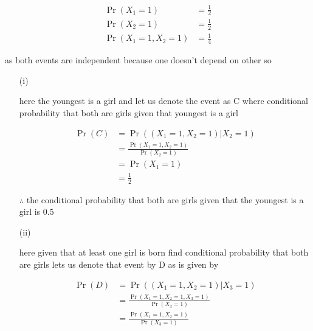 \documentclass[journal,12pt,twocolumn]{IEEEtran}
\providecommand{\pr}[1]{\ensuremath{\Pr\left(#1\right)}}
\begin{document}
    \begin{align}
        \pr{ X_{1} = 1 } &= \frac{1}{2} \\
        \pr{ X_{2} = 1 } &= \frac{1}{2} \\
        \pr{ X_{1} = 1 , X_{2} = 1 } &= \frac{1}{4}
    \end{align}
    
    as both events are independent because one doesn't depend on other so
   
   

    \begin{enumerate}
    
    
    
        \item[(i)]
        
         here the youngest is a girl and let us denote the event as C where conditional probability that both are girls given that youngest is a girl
         
         \begin{align}
             \pr{C} &= \pr{ (X_{1} = 1,X_{2} = 1) | X_{2} = 1 } \\
                    &= \frac{\pr{ {X_{1} = 1,X_{2} = 1}}}{\pr{X_{2} = 1}} \\
                    &= \pr{X_{1} = 1} \\
                    &= \frac{1}{2}
         \end{align}
         
         $\therefore$ the conditional probability that both are girls given that the youngest is a girl is $0.5$
         
         
         
        \item[(ii)]
        
        here given that at least one girl is born find conditional probability that both are girls lets us denote that event by D as is given by
        
        \begin{align}
            \pr{D} &= \pr{ (X_{1} = 1,X_{2} = 1) | X_{3} = 1 } \\
                   &= \frac{\pr{ X_{1} = 1,X_{2} = 1,X_{3} = 1 }}{\pr{X_{3} = 1}} 
                   \label{eq:eq1}
                   \\
                   &= \frac{\pr{ X_{1} = 1,X_{2} = 1}}{\pr{X_{3} = 1}}
                   \label{eq:eq2}
        \end{align}
        

\end{enumerate}
\end{document}
